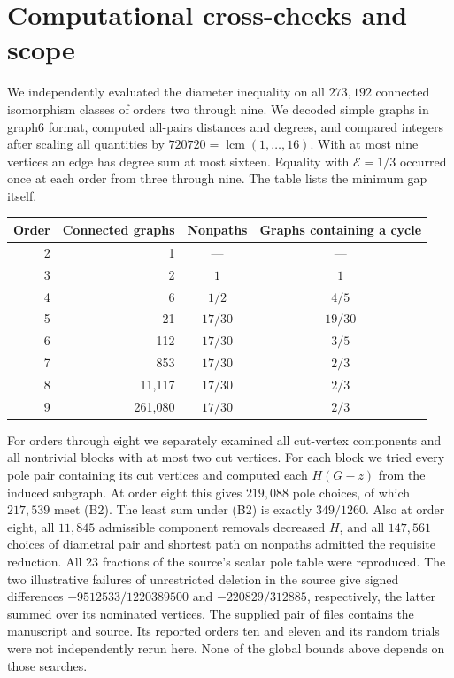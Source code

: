 \documentclass[11pt,a4paper]{article}
\newcommand{\gap}{\mathcal{E}}
\begin{document}
\section{Computational cross-checks and scope}
We independently evaluated the diameter inequality on all $273{,}192$ connected isomorphism classes of orders two through nine. We decoded simple graphs in graph6 format, computed all-pairs distances and degrees, and compared integers after scaling all quantities by $720720=\operatorname{lcm}(1,\ldots,16)$. With at most nine vertices an edge has degree sum at most sixteen. Equality with $\gap=1/3$ occurred once at each order from three through nine. The table lists the minimum gap itself.
\begin{center}\small
\begin{tabular}{r r c c}
\toprule
Order & Connected graphs & Nonpaths & Graphs containing a cycle\\
\midrule
2&1&---&---\\
3&2&$1$&$1$\\
4&6&$1/2$&$4/5$\\
5&21&$17/30$&$19/30$\\
6&112&$17/30$&$3/5$\\
7&853&$17/30$&$2/3$\\
8&11,117&$17/30$&$2/3$\\
9&261,080&$17/30$&$2/3$\\
\bottomrule
\end{tabular}
\end{center}
For orders through eight we separately examined all cut-vertex components and all nontrivial blocks with at most two cut vertices. For each block we tried every pole pair containing its cut vertices and computed each $H(G-z)$ from the induced subgraph. At order eight this gives $219{,}088$ pole choices, of which $217{,}539$ meet (B2). The least sum under (B2) is exactly $349/1260$. Also at order eight, all $11{,}845$ admissible component removals decreased $H$, and all $147{,}561$ choices of diametral pair and shortest path on nonpaths admitted the requisite reduction. All 23 fractions of the source's scalar pole table were reproduced. The two illustrative failures of unrestricted deletion in the source give signed differences $-9512533/1220389500$ and $-220829/312885$, respectively, the latter summed over its nominated vertices. The supplied pair of files contains the manuscript and source. Its reported orders ten and eleven and its random trials were not independently rerun here. None of the global bounds above depends on those searches.
\end{document}
